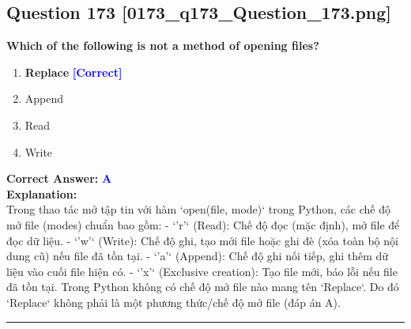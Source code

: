 \documentclass[11pt,a4paper]{article}
\begin{document}
\begin{minipage}{\textwidth}
\subsection*{Question 173 \quad \footnotesize{[0173_q173_Question_173.png]}}
\noindent \textbf{Which of the following is not a method of opening files?}

\begin{enumerate}[label=\Alph*.]
    \item \textbf{Replace} \hfill \textcolor{blue}{\textbf{[Correct]}}
    \item Append
    \item Read
    \item Write
\end{enumerate}

\noindent \textbf{Correct Answer:} \textcolor{blue}{\textbf{A}} \\[4pt]
\noindent \textbf{Explanation:}\\
Trong thao tác mở tập tin với hàm `open(file, mode)` trong Python, các chế độ mở file (modes) chuẩn bao gồm:\newline
- `'r'` (Read): Chế độ đọc (mặc định), mở file để đọc dữ liệu.\newline
- `'w'` (Write): Chế độ ghi, tạo mới file hoặc ghi đè (xóa toàn bộ nội dung cũ) nếu file đã tồn tại.\newline
- `'a'` (Append): Chế độ ghi nối tiếp, ghi thêm dữ liệu vào cuối file hiện có.\newline
- `'x'` (Exclusive creation): Tạo file mới, báo lỗi nếu file đã tồn tại.\newline
Trong Python không có chế độ mở file nào mang tên `Replace`. Do đó `Replace` không phải là một phương thức/chế độ mở file (đáp án A).
\end{minipage}
\vspace{0.8cm}
\hrule
\vspace{0.5cm}
\end{document}
